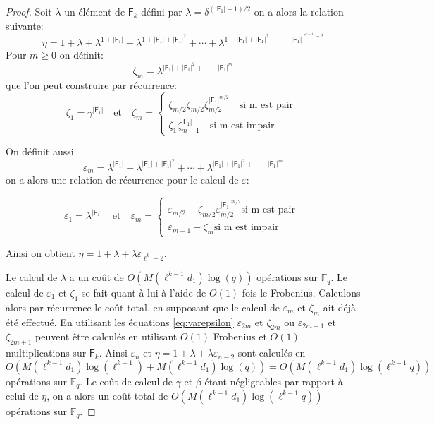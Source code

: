 \documentclass[10pt,a4paper]{book}
\theoremstyle{plain}
\theoremstyle{definition}
\theoremstyle{definition}
\theoremstyle{definition}
\theoremstyle{definition}
\theoremstyle{remark}
\theoremstyle{remark}
\theoremstyle{definition}
\begin{document}
\begin{proof}
Soit $\lambda$ un élément de $\mathsf{F}_k$ défini par $\lambda = \delta^{(|\mathsf{F}_1|-1)/2} $ on a alors la relation suivante:
\begin{equation*}
\eta = 1 + \lambda + \lambda^{1+|\mathsf{F}_1|} + \lambda^{1+|\mathsf{F}_1|+|\mathsf{F}_1|^{2}} + \cdots + \lambda^{1+|\mathsf{F}_1|+|\mathsf{F}_1|^{2}+\cdots+|\mathsf{F}_1|^{\ell^{k-1}-2}} 
\end{equation*}
Pour $m \geqslant 0$ on définit:
\begin{equation}
\zeta_m=\lambda^{|\mathsf{F}_1|+|\mathsf{F}_1|^2+\cdots+|\mathsf{F}_1|^{m}} 
\end{equation}
que l'on peut construire par récurrence:
\begin{equation*}
\zeta_1=\gamma^{|\mathsf{F}_1|} \quad \text{et} \quad
\zeta_m=
\begin{cases} 
\zeta_{m/2}  \zeta_{m/2}\zeta_{m/2}^{|\mathsf{F}_1|^{m/2}} \quad \text{si m est pair }\\
\zeta_{1}  \zeta_{m-1}^{|\mathsf{F}_1|} \quad \text{si m est impair}
\end{cases}
\end{equation*}

On définit aussi
\begin{equation*}
\varepsilon_m=\lambda^{|\mathsf{F}_1|} + \lambda^{|\mathsf{F}_1|+|\mathsf{F}_1|^{2}} + \cdots + \lambda^{|\mathsf{F}_1|+|\mathsf{F}_1|^{2}+\cdots+|\mathsf{F}_1|^{m}}
\end{equation*} 
on a alors une relation de récurrence pour le calcul de $\varepsilon$:

\begin{equation}
\label{eq:varepsilon}
\varepsilon_1=\lambda^{|\mathsf{F}_1|} \quad \text{et} \quad
\varepsilon_m=
\begin{cases} 
\varepsilon_{m/2} + \zeta_{m/2}\varepsilon_{m/2}^{|\mathsf{F}_1|^{m/2}} \text{si m est pair }\\
\varepsilon_{m-1} + \zeta_{m} \text{si m est impair}
\end{cases}
\end{equation}

Ainsi on obtient $\eta=1+\lambda+\lambda \varepsilon_{\ell^k-2}$. 

 
Le calcul de $\lambda$ a un coût de $O(M(\ell^{k-1}d_1)\log(q))$ opérations sur $\mathbb{F}_q$. Le calcul de $\varepsilon_1$ et $\zeta_1$ se fait quant à lui à l'aide de $O(1)$ fois le Frobenius. Calculons alors par récurrence le coût total, en supposant que le calcul de $\varepsilon_m$ et $\zeta_m$ ait déjà été effectué. En utilisant les équations \eqref{eq:varepsilon} $\varepsilon_{2m}$ et $\zeta_{2m}$ ou $\varepsilon_{2m+1}$ et $\zeta_{2m+1}$ peuvent être calculés en utilisant $O(1)$ Frobenius et $O(1)$ multiplications sur $\mathsf{F}_{k}$. Ainsi $\varepsilon_n$ et $\eta=1+\lambda+\lambda\varepsilon_{n-2}$ sont calculés en $O(M(\ell^{k-1}d_1)\log(\ell^{k-1})+M(\ell^{k-1}d_1)\log(q))=O(M(\ell^{k-1}d_1)\log(\ell^{k-1}q))$ opérations sur $\mathbb{F}_q$.
Le coût de calcul de $\gamma$ et $\beta$ étant négligeables par rapport à celui de $\eta$, on a alors un coût total de $O(M(\ell^{k-1}d_1)\log(\ell^{k-1}q))$ opérations sur $\mathbb{F}_q$.

\end{proof}
\end{document}
